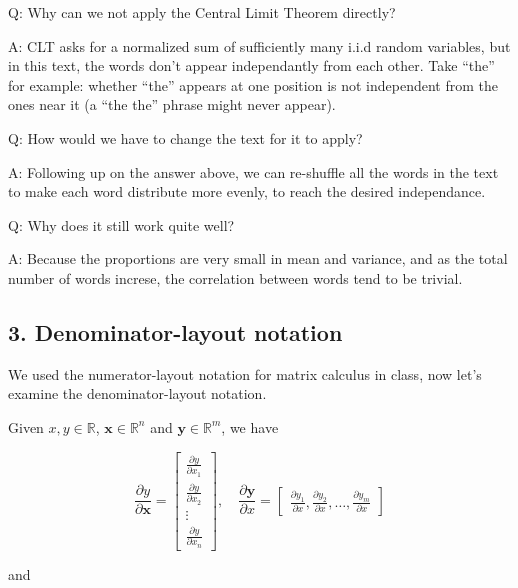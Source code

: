\documentclass[11pt]{article}
\begin{document}
    Q: Why can we not apply the Central Limit Theorem directly?

A: CLT asks for a normalized sum of sufficiently many i.i.d random
variables, but in this text, the words don't appear independantly from
each other. Take ``the'' for example: whether ``the'' appears at one
position is not independent from the ones near it (a ``the the'' phrase
might never appear).

Q: How would we have to change the text for it to apply?

A: Following up on the answer above, we can re-shuffle all the words in
the text to make each word distribute more evenly, to reach the desired
independance.

Q: Why does it still work quite well?

A: Because the proportions are very small in mean and variance, and as
the total number of words increse, the correlation between words tend to
be trivial.

    \hypertarget{denominator-layout-notation}{%
\subsection{3. Denominator-layout
notation}\label{denominator-layout-notation}}

We used the numerator-layout notation for matrix calculus in class, now
let's examine the denominator-layout notation.

Given \(x, y\in\mathbb R\), \(\mathbf x\in\mathbb R^n\) and
\(\mathbf y \in \mathbb R^m\), we have

\[
\frac{\partial y}{\partial \mathbf{x}}=\begin{bmatrix}
\frac{\partial y}{\partial x_1}\\
\frac{\partial y}{\partial x_2}\\
\vdots\\
\frac{\partial y}{\partial x_n}
\end{bmatrix},\quad 
\frac{\partial \mathbf y}{\partial {x}}=\begin{bmatrix}
\frac{\partial y_1}{\partial x}, 
\frac{\partial y_2}{\partial x}, 
\ldots,
\frac{\partial y_m}{\partial x}
\end{bmatrix}
\]

and
\end{document}
